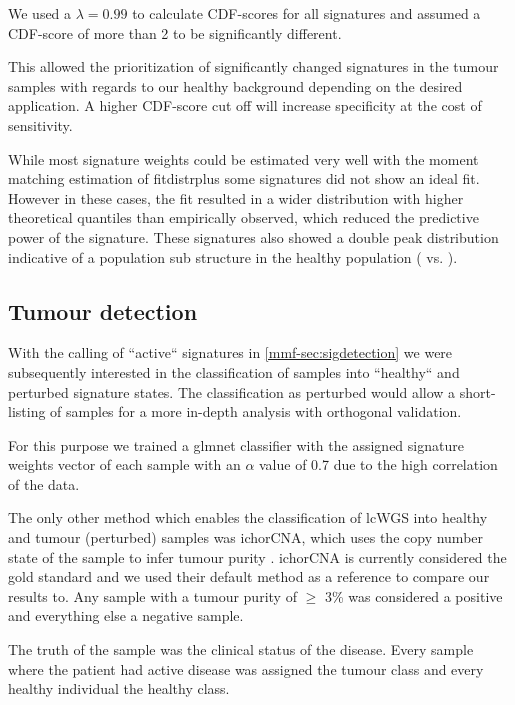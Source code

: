 We used a $\lambda = 0.99$ to calculate CDF-scores for all signatures and assumed a CDF-score of more than 2 to be significantly different.

This allowed the prioritization of significantly changed signatures in the tumour samples with regards to our healthy background depending on the desired application. A higher CDF-score cut off will increase specificity at the cost of sensitivity.

While most signature weights could be estimated very well with the moment matching estimation of fitdistrplus \cite{DelignetteMuller2015} some signatures did not show an ideal fit.  However in these cases, the fit resulted in a wider distribution with higher theoretical quantiles than empirically observed, which reduced the predictive power of the signature. These signatures also showed a double peak distribution indicative of a population sub structure in the healthy population ( vs. ).


\subsection{Tumour detection}
\label{mmf-sec:tumourdetection}

With the calling of ``active`` signatures in \autoref{mmf-sec:sigdetection} we were subsequently interested in the classification of samples into ``healthy`` and perturbed signature states. The classification as perturbed would allow a short-listing of samples for a more in-depth analysis with orthogonal validation.

For this purpose we trained a glmnet classifier with the assigned signature weights vector of each sample with an $\alpha$ value of 0.7 due to the high correlation of the data.

The only other method which enables the classification of lcWGS into healthy and tumour (perturbed) samples was ichorCNA, which uses the copy number state of the sample to infer tumour purity  \cite{Adalsteinsson2017}. ichorCNA is currently considered the gold standard and we used their default method as a reference to compare our results to. Any sample with a tumour purity of $\geq$ 3\% was considered a positive and everything else a negative sample.

The truth of the sample was the clinical status of the disease. Every sample where the patient had active disease was assigned the tumour class and every healthy individual the healthy class.
